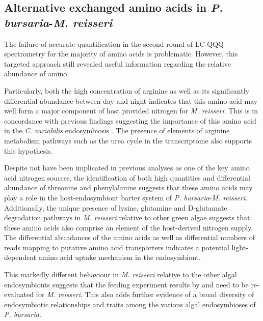 
\subsection{Alternative exchanged amino acids in \textit{P. bursaria}-\textit{M. reisseri}}

The failure of accurate quantification in the second round
of LC-QQQ spectrometry for the majority of amino acids 
is problematic.  However, this targeted approach still revealed
useful information regarding the relative abundance of amino.

Particularly, both the high concentration of arginine as well
as its significantly differential abundance between day and night
indicates that this amino acid may well form a major component of 
host provided nitrogen for \textit{M. reisseri}. This is in
concordance with previous findings suggesting 
the importance of this amino acid in the \textit{C. variabilis}
endosymbiosis \citep{Kato2006}.  The presence of elements of 
arginine metabolism pathways such as the urea cycle in the transcriptome 
also supports this hypothesis. 


Despite not have been implicated in previous analyses
as one of the key amino acid nitrogen sources, the identification
of both high quantities and differential abundance of
threonine and phenylalanine suggests that these
amino acids may play a role in the host-endosymbiont
barter system of \textit{P. bursaria}-\textit{M. reisseri}.
Additionally, the unique presence of lysine, glutamine and D-glutamate 
degradation pathways in \textit{M. reisseri} relative to other green algae
suggests that these amino acids also comprise an element of the host-derived
nitrogen supply.
The differential abundances of the amino acids as well as
differential numbers of reads mapping to putative amino acid
transporters indicates a potential light-dependent amino acid
uptake mechanism in the endosymbiont.


This markedly different behaviour in \textit{M. reisseri} relative
to the other algal endosymbionts suggests that the feeding experiment
results by \citep{Kato2006} and \citep{Kato2009a} need 
to be re-evaluated for \textit{M. reisseri}. This also
adds further evidence of a broad diversity of endosymbiotic
relationships and traits among the various algal endosymbioses
of \textit{P. bursaria}.


